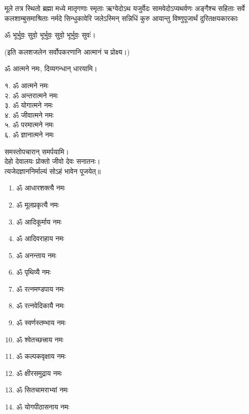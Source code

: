 {मूले तत्र स्थितो ब्रह्मा मध्ये मातृगणाः स्मृताः}
{ऋग्वेदोऽथ यजुर्वेदः सामवेदोऽप्यथर्वणः}
{अङ्गैश्च सहिताः सर्वे कलशाम्बुसमाश्रिताः}
{नर्मदे सिन्धुकावेरि जलेऽस्मिन् सन्निधिं कुरु}
{आयान्तु विष्णुपूजार्थं दुरितक्षयकारकाः}

\centerline{ॐ भूर्भुवः॒ सुवो॒ भूर्भुवः॒ सुवो॒ भूर्भुवः॒ सुवः॑।}

(इति कलशजलेन सर्वोपकरणानि आत्मानं च प्रोक्ष्य।)

ॐ आत्मने नमः, दिव्यगन्धान् धारयामि।
\begin{multicols}{2}
१. ॐ आत्मने नमः\\
२. ॐ अन्तरात्मने नमः\\
३. ॐ योगात्मने नमः\\
४. ॐ जीवात्मने नमः\\
५. ॐ परमात्मने नमः\\
६. ॐ ज्ञानात्मने नमः
\end{multicols}
समस्तोपचारान् समर्पयामि।\\

देहो देवालयः प्रोक्तो जीवो देवः सनातनः।\\
त्यजेदज्ञाननिर्माल्यं सोऽहं भावेन पूजयेत्॥\\

\begin{multicols}{2}
\begin{enumerate}
\item ॐ आधारशक्त्यै नमः
\item ॐ मूलप्रकृत्यै नमः
\item ॐ आदिकूर्माय नमः 
\item ॐ आदिवराहाय नमः
\item ॐ अनन्ताय नमः
\item ॐ पृथिव्यै नमः
\item ॐ रत्नमण्डपाय नमः
\item ॐ रत्नवेदिकायै नमः
\item ॐ स्वर्णस्तम्भाय नमः
\item ॐ श्वेतच्छत्त्राय नमः
\item ॐ कल्पकवृक्षाय नमः
\item ॐ क्षीरसमुद्राय नमः 
\item ॐ सितचामराभ्यां नमः
\item ॐ योगपीठासनाय नमः
\end{enumerate}
\end{multicols}

